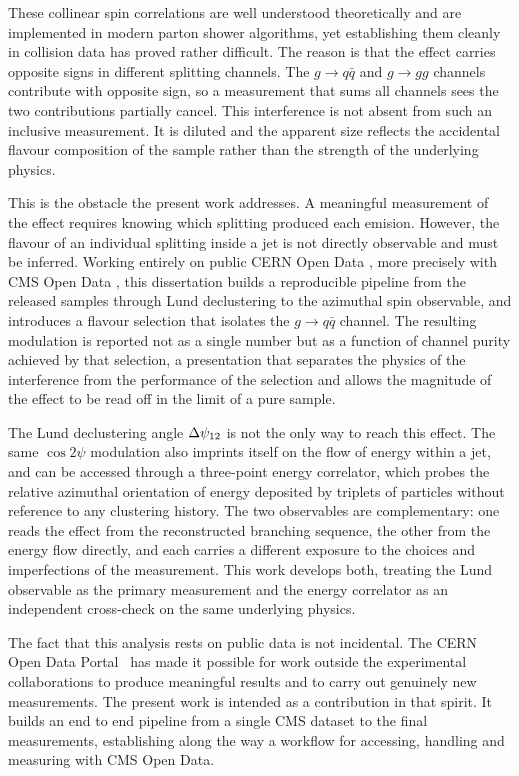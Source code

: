 These collinear spin correlations are well understood theoretically and are implemented in
modern parton shower algorithms, yet establishing them cleanly in collision data has
proved rather difficult. The reason is that the effect carries opposite signs in different
splitting channels. The $g \to q\bar{q}$ and $g \to gg$ channels contribute with opposite
sign, so a measurement that sums all channels sees the two contributions partially cancel.
This interference is not absent from such an inclusive measurement. It is diluted
and the apparent size reflects the accidental flavour composition of the sample rather than the
strength of the underlying physics.

This is the obstacle the present work addresses. A meaningful measurement of the
effect requires knowing which splitting produced each emision. However, the flavour
of an individual splitting inside a jet is not directly observable and must be inferred.
Working entirely on public CERN Open Data \cite{CERNOpenData}, more precisely with
CMS Open Data \cite{CMSOpenDataGuide}, this dissertation builds a reproducible pipeline
from the released samples through Lund declustering to the azimuthal spin observable,
and introduces a flavour selection that isolates the $g \to q\bar{q}$ channel. The
resulting modulation is reported not as a single number but as a function of channel
purity achieved by that selection, a
presentation that separates the physics of the interference from the performance
of the selection and allows the magnitude of the effect to be read off in the
limit of a pure sample.

The Lund declustering angle $\Delta\psi_{12}$ is not the only way to reach this effect.
The same $\cos 2\psi$ modulation also imprints itself on the flow of energy
within a jet, and can be accessed through a three-point energy correlator, which
probes the relative azimuthal orientation of energy deposited by triplets of
particles without reference to any clustering history. The two observables are
complementary: one reads the effect from the reconstructed branching sequence,
the other from the energy flow directly, and each carries a different exposure to
the choices and imperfections of the measurement. This work develops both, 
treating the Lund observable as the primary measurement and the energy correlator
as an independent cross-check on the same underlying physics.

The fact that this analysis rests on public data is not incidental.
The CERN Open Data Portal~\cite{CERNOpenData} has made it possible for work
outside the experimental collaborations to produce meaningful results and to
carry out genuinely new measurements. The present work is intended as a
contribution in that spirit. It builds an end to end pipeline from a single
CMS dataset to the final measurements, establishing along the way a workflow
for accessing, handling and measuring with CMS Open Data.

